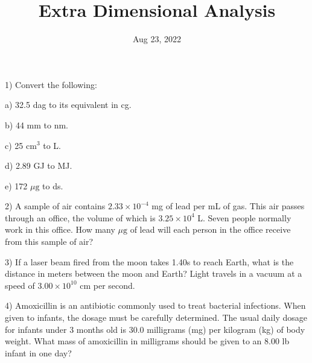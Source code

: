 \documentclass[12pt]{article}
\title{\textbf{Extra Dimensional Analysis}}
\date{Aug 23, 2022}
\begin{document}
\maketitle 

1) Convert the following:

a) 32.5 dag to its equivalent in cg.

b) 44 mm to nm.

c) 25 cm$^3$ to L.

d) 2.89 GJ to MJ.

e) 172 $\mu\text{g}$ to ds.

2) A sample of air contains $2.33 \times 10^{-4}$ mg of lead per mL of gas.
This air passes through an office, the volume of which is $3.25 \times 10^4$ L.
Seven people normally work in this office. How many $\mu\text{g}$ of lead will each
person in the office receive from this sample of air?

3) If a laser beam fired from the moon takes 1.40s to reach Earth, what is the
distance in meters between the moon and Earth? Light travels in a vacuum
at a speed of $3.00 \times 10^{10}$ cm per second.

4) Amoxicillin is an antibiotic commonly used to treat bacterial infections.
When given to infants, the dosage must be carefully determined. The usual
daily dosage for infants under 3 months old is 30.0 milligrams (mg) per kilogram
(kg) of body weight. What mass of amoxicillin in milligrams should be given to
an 8.00 lb infant in one day?
\end{document}
